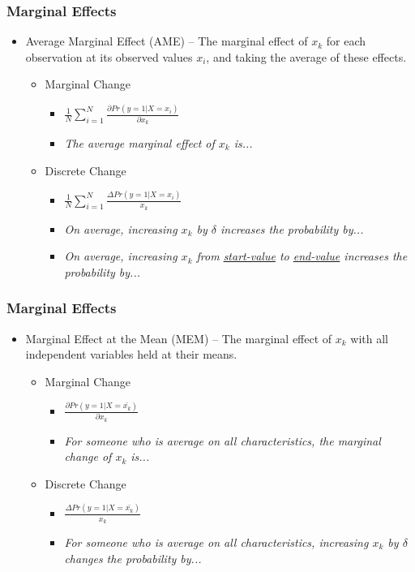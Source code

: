 \documentclass{beamer}
\begin{document}
\begin{frame}
	\frametitle{Marginal Effects}
	\begin{itemize}
		\item Average Marginal Effect (AME) -- The marginal effect of $x_{k}$ for each observation at its observed values $x_{i}$, and taking the average of these effects.
		\begin{itemize}
			\item Marginal Change
			\begin{itemize}
				\item $\frac{1}{N}\sum_{i=1}^{N}\frac{\partial Pr\left(y=1|X=x_{i}\right)}{\partial x_{k}}$
				\item \textit{The average marginal effect of $x_{k}$ is...}
			\end{itemize}
			\item Discrete Change
			\begin{itemize}
				\item $\frac{1}{N}\sum_{i=1}^{N}\frac{\Delta Pr\left(y=1|X=x_{i}\right)}{x_{k}}$
				\item \textit{On average, increasing $x_{k}$ by $\delta$ increases the probability by...}
				\item \textit{On average, increasing $x_{k}$ from \underline{start-value} to \underline{end-value} increases the probability by...}
			\end{itemize}
		\end{itemize}
	\end{itemize}
\end{frame}

\begin{frame}
	\frametitle{Marginal Effects}
	\begin{itemize}
		\item Marginal Effect at the Mean (MEM) -- The marginal effect of $x_{k}$ with all independent variables held at their means.
		\begin{itemize}
			\item Marginal Change
			\begin{itemize}
				\item $\frac{\partial Pr\left(y=1|X=\bar{x_{k}}\right)}{\partial x_{k}}$
				\item \textit{For someone who is average on all characteristics, the marginal change of $x_{k}$ is...}
			\end{itemize}
			\item Discrete Change
			\begin{itemize}
				\item $\frac{\Delta Pr\left(y=1|X=\bar{x_{k}}\right)}{x_{k}}$
				\item \textit{For someone who is average on all characteristics, increasing $x_{k}$ by $\delta$ changes the probability by...}
			\end{itemize}
		\end{itemize}
	\end{itemize}
\end{frame}
\end{document}
